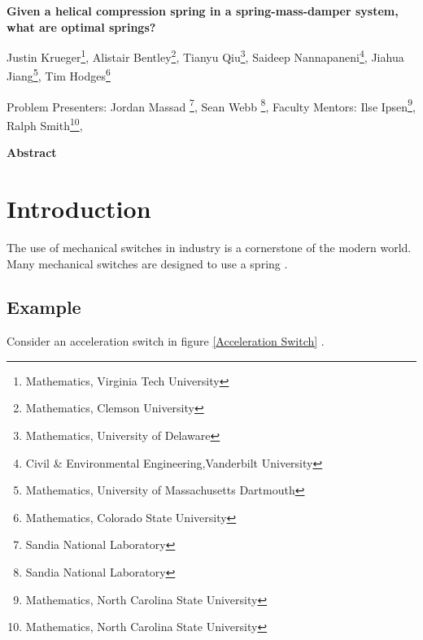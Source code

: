 \documentclass[10pt]{article}
\begin{document}
\centerline{\large \bf Given a helical compression spring in a spring-mass-damper system, what are optimal springs?}

\vspace{.1truein}

\def\thefootnote{\arabic{footnote}}
\begin{center}
  Justin Krueger\footnote{Mathematics, Virginia Tech University},
  Alistair Bentley\footnote{Mathematics, Clemson University},
  Tianyu Qiu\footnote{Mathematics, University of Delaware},
  Saideep Nannapaneni\footnote{Civil \& Environmental Engineering,Vanderbilt University},
  Jiahua Jiang\footnote{Mathematics, University of Massachusetts Dartmouth },
  Tim Hodges\footnote{Mathematics, Colorado State University}
\end{center}


\begin{center}
Problem Presenters: Jordan Massad \footnote{Sandia National Laboratory},
Sean Webb \footnote{Sandia National Laboratory},
	Faculty Mentors: Ilse Ipsen\footnote{Mathematics, North Carolina State University},
	Ralph Smith\footnote{Mathematics, North Carolina State University}, 
\end{center}


\vspace{.3truein}
\centerline{\bf Abstract}






\section{Introduction}
\label{sec:Introduction}

The use of mechanical switches in industry is a cornerstone of the modern world. Many mechanical switches are designed to use a spring \cite{SpringDevice}. 

\subsection{Example}
\label{sec:example}
Consider an acceleration switch in figure \ref{Acceleration Switch} . 
\end{document}
